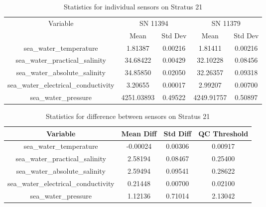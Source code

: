 \begin{table}[h]
\centering
\begin{tabular}{|c|c|c|c|c|}
\hline
Variable & \multicolumn{2}{c|}{SN 11394} & \multicolumn{2}{c|}{SN 11379} \\
& Mean & Std Dev & Mean & Std Dev \\
\hline
sea\_water\_temperature & 1.81387 & 0.00216 & 1.81411 & 0.00216 \\
sea\_water\_practical\_salinity & 34.68422 & 0.00429 & 32.10228 & 0.08456 \\
sea\_water\_absolute\_salinity & 34.85850 & 0.02050 & 32.26357 & 0.09318 \\
sea\_water\_electrical\_conductivity & 3.20655 & 0.00017 & 2.99207 & 0.00700 \\
sea\_water\_pressure & 4251.03893 & 0.49522 & 4249.91757 & 0.50897 \\
\hline
\end{tabular}
\caption{Statistics for individual sensors on Stratus 21}
\end{table}

\begin{table}[h]
\centering
\begin{tabular}{|c|c|c|c|}
\hline
Variable & Mean Diff & Std Diff & QC Threshold \\
\hline
sea\_water\_temperature & -0.00024 & 0.00306 & 0.00917 \\
sea\_water\_practical\_salinity & 2.58194 & 0.08467 & 0.25400 \\
sea\_water\_absolute\_salinity & 2.59494 & 0.09541 & 0.28622 \\
sea\_water\_electrical\_conductivity & 0.21448 & 0.00700 & 0.02100 \\
sea\_water\_pressure & 1.12136 & 0.71014 & 2.13042 \\
\hline
\end{tabular}
\caption{Statistics for difference between sensors on Stratus 21}
\end{table}
